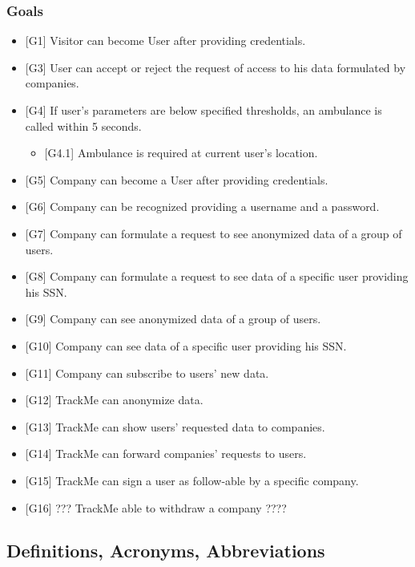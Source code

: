 \documentclass{article}
\begin{document}
\subsubsection{Goals}
\begin{itemize}
	\item {[G1]} Visitor can become User after providing credentials.
	\item {[G3]} User can accept or reject the request of access to his data formulated by companies.
	\item {[G4]} If user's parameters are below specified thresholds, an ambulance is called within 5 seconds. 
	\begin{itemize}
		\item {[G4.1]} Ambulance is required at current user's location. 
	\end{itemize}
	\item {[G5]} Company can become a User after providing credentials. 
	\item {[G6]} Company can be recognized providing a username and a password.
	\item {[G7]} Company can formulate a request to see anonymized data of a group of users.
	\item {[G8]} Company can formulate a request to see data of a specific user providing his SSN.
	\item {[G9]} Company can see anonymized data of a group of users.
	\item {[G10]} Company can see data of a specific user providing his SSN.
	\item {[G11]} Company can subscribe to users' new data.
	\item {[G12]} TrackMe can anonymize data.
	\item {[G13]} TrackMe can show users' requested data to companies.
	\item {[G14]} TrackMe can forward companies' requests to users. 
	\item {[G15]} TrackMe can sign a user as follow-able  by a specific company. 
	\item {[G16]} ??? TrackMe able to withdraw a company ????
\end{itemize} 
\subsection{Definitions, Acronyms, Abbreviations}
\end{document}
